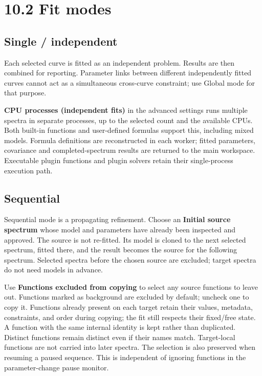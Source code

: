 \documentclass[
  10pt,
  a4paper,
  oneside]{scrreprt}
\begin{document}
\hypertarget{fit-modes}{%
\section{10.2 Fit modes}\label{fit-modes}}

\hypertarget{single-independent}{%
\subsection{Single / independent}\label{single-independent}}

Each selected curve is fitted as an independent problem. Results are
then combined for reporting. Parameter links between different
independently fitted curves cannot act as a simultaneous cross-curve
constraint; use Global mode for that purpose.

\textbf{CPU processes (independent fits)} in the advanced settings runs
multiple spectra in separate processes, up to the selected count and the
available CPUs. Both built-in functions and user-defined formulas
support this, including mixed models. Formula definitions are
reconstructed in each worker; fitted parameters, covariance and
completed-spectrum results are returned to the main workspace.
Executable plugin functions and plugin solvers retain their
single-process execution path.

\hypertarget{sequential}{%
\subsection{Sequential}\label{sequential}}

Sequential mode is a propagating refinement. Choose an \textbf{Initial
source spectrum} whose model and parameters have already been inspected
and approved. The source is not re-fitted. Its model is cloned to the
next selected spectrum, fitted there, and the result becomes the source
for the following spectrum. Selected spectra before the chosen source
are excluded; target spectra do not need models in advance.

Use \textbf{Functions excluded from copying} to select any source
functions to leave out. Functions marked as background are excluded by
default; uncheck one to copy it. Functions already present on each
target retain their values, metadata, constraints, and order during
copying; the fit still respects their fixed/free state. A function with
the same internal identity is kept rather than duplicated. Distinct
functions remain distinct even if their names match. Target-local
functions are not carried into later spectra. The selection is also
preserved when resuming a paused sequence. This is independent of
ignoring functions in the parameter-change pause monitor.
\end{document}
